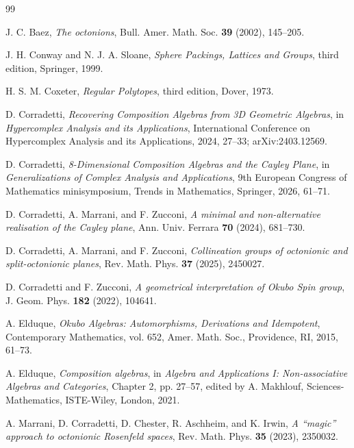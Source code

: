 \documentclass{birkjour}
\numberwithin{equation}{section}
\begin{document}
\begin{thebibliography}{99}

J. C. Baez,
\emph{The octonions},
Bull. Amer. Math. Soc. \textbf{39} (2002), 145--205.

J. H. Conway and N. J. A. Sloane,
\emph{Sphere Packings, Lattices and Groups},
third edition, Springer, 1999.

H. S. M. Coxeter,
\emph{Regular Polytopes},
third edition, Dover, 1973.

D. Corradetti,
\emph{Recovering Composition Algebras from 3D Geometric Algebras},
in \emph{Hypercomplex Analysis and its Applications}, International Conference
on Hypercomplex Analysis and its Applications, 2024, 27--33;
arXiv:2403.12569.

D. Corradetti,
\emph{8-Dimensional Composition Algebras and the Cayley Plane},
in \emph{Generalizations of Complex Analysis and Applications}, 9th European
Congress of Mathematics minisymposium, Trends in Mathematics, Springer, 2026,
61--71.

D. Corradetti, A. Marrani, and F. Zucconi,
\emph{A minimal and non-alternative realisation of the Cayley plane},
Ann. Univ. Ferrara \textbf{70} (2024), 681--730.

D. Corradetti, A. Marrani, and F. Zucconi,
\emph{Collineation groups of octonionic and split-octonionic planes},
Rev. Math. Phys. \textbf{37} (2025), 2450027.

D. Corradetti and F. Zucconi,
\emph{A geometrical interpretation of Okubo Spin group},
J. Geom. Phys. \textbf{182} (2022), 104641.

A. Elduque,
\emph{Okubo Algebras: Automorphisms, Derivations and Idempotent},
Contemporary Mathematics, vol. 652, Amer. Math. Soc., Providence, RI, 2015,
61--73.

A. Elduque,
\emph{Composition algebras},
in \emph{Algebra and Applications I: Non-associative Algebras and Categories},
Chapter 2, pp. 27--57, edited by A. Makhlouf, Sciences-Mathematics,
ISTE-Wiley, London, 2021.

A. Marrani, D. Corradetti, D. Chester, R. Aschheim, and K. Irwin,
\emph{A ``magic'' approach to octonionic Rosenfeld spaces},
Rev. Math. Phys. \textbf{35} (2023), 2350032.


\end{thebibliography}
\end{document}
